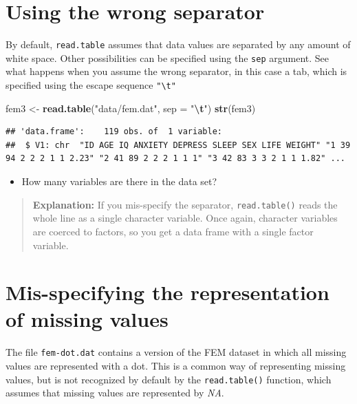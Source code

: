 \documentclass[
]{book}
\newenvironment{Shaded}{\begin{snugshade}}{\end{snugshade}}
\newcommand{\AttributeTok}[1]{\textcolor[rgb]{0.13,0.29,0.53}{#1}}
\newcommand{\FunctionTok}[1]{\textcolor[rgb]{0.13,0.29,0.53}{\textbf{#1}}}
\newcommand{\NormalTok}[1]{#1}
\newcommand{\OtherTok}[1]{\textcolor[rgb]{0.56,0.35,0.01}{#1}}
\newcommand{\SpecialCharTok}[1]{\textcolor[rgb]{0.81,0.36,0.00}{\textbf{#1}}}
\newcommand{\StringTok}[1]{\textcolor[rgb]{0.31,0.60,0.02}{#1}}
\providecommand{\tightlist}{%
  \setlength{\itemsep}{0pt}\setlength{\parskip}{0pt}}
\begin{document}
\section{Using the wrong separator}\label{using-the-wrong-separator}

By default, \texttt{read.table} assumes that data values are separated
by any amount of white space. Other possibilities can be specified
using the \texttt{sep} argument. See what happens when you assume the
wrong separator, in this case a tab, which is specified using the
escape sequence \texttt{"\textbackslash{}t"}

\begin{Shaded}
\begin{Highlighting}[]
\NormalTok{fem3 }\OtherTok{\textless{}{-}} \FunctionTok{read.table}\NormalTok{(}\StringTok{"data/fem.dat"}\NormalTok{, }\AttributeTok{sep =} \StringTok{"}\SpecialCharTok{\textbackslash{}t}\StringTok{"}\NormalTok{)}
\FunctionTok{str}\NormalTok{(fem3)}
\end{Highlighting}
\end{Shaded}

\begin{verbatim}
## 'data.frame':    119 obs. of  1 variable:
##  $ V1: chr  "ID AGE IQ ANXIETY DEPRESS SLEEP SEX LIFE WEIGHT" "1 39 94 2 2 2 1 1 2.23" "2 41 89 2 2 2 1 1 1" "3 42 83 3 3 2 1 1 1.82" ...
\end{verbatim}

\begin{itemize}
\tightlist
\item
  How many variables are there in the data set?
\end{itemize}

\begin{quote}
\textbf{Explanation:} If you mis-specify the separator,
\texttt{read.table()} reads the whole line as a single character
variable. Once again, character variables are coerced to factors, so
you get a data frame with a single factor variable.
\end{quote}

\section{Mis-specifying the representation of missing values}\label{mis-specifying-the-representation-of-missing-values}

The file \texttt{fem-dot.dat} contains a version of the FEM dataset in
which all missing values are represented with a dot. This is a common
way of representing missing values, but is not recognized by default
by the \texttt{read.table()} function, which assumes that missing values
are represented by \emph{NA}.
\end{document}
